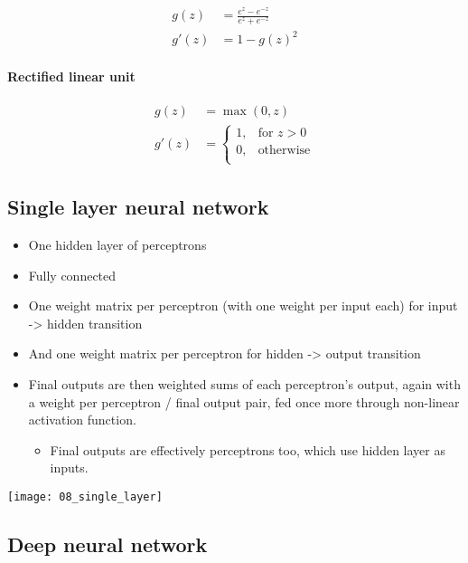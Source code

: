 \begin{align*}
		g(z) & = \frac{e^z - e^{-z}}{e^z + e^{-z}} \\
		g'(z) & = 1 - g(z)^2
\end{align*}

\paragraph{Rectified linear unit}

\begin{align*}
		g(z) & = \max(0, z) \\
		g'(z) & = \left\{\begin{array}{lr}
						1, & \text{for } z > 0 \\
						0, & \text{otherwise} \\
		\end{array}\right.
\end{align*}

\subsection{Single layer neural network}

\begin{itemize}
		\item One hidden layer of perceptrons
		\item Fully connected
		\item One weight matrix per perceptron (with one weight per input each) for input -> hidden transition
		\item And one weight matrix per perceptron for hidden -> output transition
		\item Final outputs are then weighted sums of each perceptron's output,
				again with a weight per perceptron / final output pair, fed
				once more through non-linear activation function.
				\begin{itemize}
						\item Final outputs are effectively perceptrons too,
								which use hidden layer as inputs.
				\end{itemize}
\end{itemize}

\texttt{[image: 08\_single\_layer]}

\subsection{Deep neural network}

